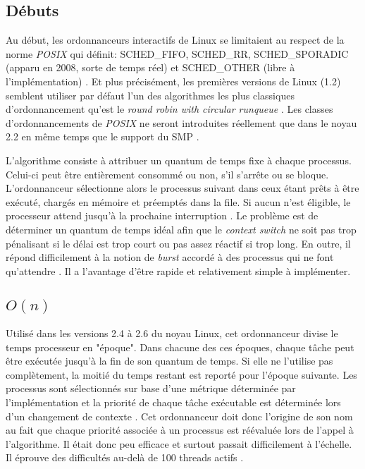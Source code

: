 \documentclass[letterpaper]{article}
\begin{document}
\subsection{Débuts}

Au début, les ordonnanceurs interactifs de Linux se limitaient au respect de la norme \textit{POSIX} qui définit: SCHED\_FIFO, SCHED\_RR, SCHED\_SPORADIC (apparu en 2008, sorte de temps réel) et SCHED\_OTHER (libre à l'implémentation) \citep{6506091}. Et plus précisément, les premières versions de Linux (1.2) semblent utiliser par défaut l'un des algorithmes les plus classiques d'ordonnancement qu'est le \textit{round robin with circular runqueue} \citep{Maxwell:1999:LCK:519502, Beck:1996:LKI:547935}. Les classes d'ordonnancements de \textit{POSIX} ne seront introduites réellement que dans le noyau 2.2 en même temps que le support du SMP \citep{ScalableLinuxScheduling}.

L'algorithme consiste à attribuer un quantum de temps fixe à chaque processus. Celui-ci peut être entièrement consommé ou non, s'il s'arrête ou se bloque. L'ordonnanceur sélectionne alors le processus suivant dans ceux étant prêts à être exécuté, chargés en mémoire et préemptés dans la file. Si aucun n'est éligible, le processeur attend jusqu'à la prochaine interruption \citep{corbato1962experimental}. Le problème est de déterminer un quantum de temps idéal afin que le \textit{context switch} ne soit pas trop pénalisant si le délai est trop court ou pas assez réactif si trop long. En outre, il répond difficilement à la notion de \textit{burst} accordé à des processus qui ne font qu'attendre \citep{Bach:1986:DUO:8570}. Il a l'avantage d'être rapide et relativement simple à implémenter.

\subsection{$O(n)$}

Utilisé dans les versions 2.4 à 2.6 du noyau Linux, cet ordonnanceur divise le temps processeur en "époque". Dans chacune des ces époques, chaque tâche peut être exécutée jusqu'à la fin de son quantum de temps. Si elle ne l'utilise pas complètement, la moitié du temps restant est reporté pour l'époque suivante. Les processus sont sélectionnés sur base d'une métrique déterminée par l'implémentation et la priorité de chaque tâche exécutable est déterminée lors d'un changement de contexte \citep{Bovet:2005:ULK:1077084}.
Cet ordonnanceur doit donc l'origine de son nom au fait que chaque priorité associée à un processus est réévaluée lors de l'appel à l'algorithme. Il était donc peu efficace et surtout passait difficilement à l'échelle. Il éprouve des difficultés au-delà de 100 threads actifs \citep{Nieh:2001:VRO:647055.715911}.
\end{document}
